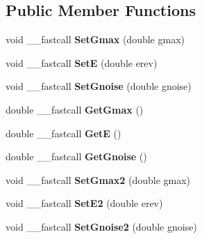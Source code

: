 \subsection*{Public Member Functions}
\begin{DoxyCompactItemize}
\item 
\hypertarget{class_t_h_h2_current_a1a74206e21791457b2d88a212c8911b3}{void \+\_\+\+\_\+fastcall {\bfseries Set\+Gmax} (double gmax)}\label{class_t_h_h2_current_a1a74206e21791457b2d88a212c8911b3}

\item 
\hypertarget{class_t_h_h2_current_a57808f5995477893b087c6381c957626}{void \+\_\+\+\_\+fastcall {\bfseries Set\+E} (double erev)}\label{class_t_h_h2_current_a57808f5995477893b087c6381c957626}

\item 
\hypertarget{class_t_h_h2_current_a6c46b837252a9615d2f9cb30949088d7}{void \+\_\+\+\_\+fastcall {\bfseries Set\+Gnoise} (double gnoise)}\label{class_t_h_h2_current_a6c46b837252a9615d2f9cb30949088d7}

\item 
\hypertarget{class_t_h_h2_current_a9bb350baab01c72a7477ec1c354778a4}{double \+\_\+\+\_\+fastcall {\bfseries Get\+Gmax} ()}\label{class_t_h_h2_current_a9bb350baab01c72a7477ec1c354778a4}

\item 
\hypertarget{class_t_h_h2_current_ab37ef56e6ceeea0b0054c79d15a5612a}{double \+\_\+\+\_\+fastcall {\bfseries Get\+E} ()}\label{class_t_h_h2_current_ab37ef56e6ceeea0b0054c79d15a5612a}

\item 
\hypertarget{class_t_h_h2_current_afe78109bb8371fa808f928c7b87dc22e}{double \+\_\+\+\_\+fastcall {\bfseries Get\+Gnoise} ()}\label{class_t_h_h2_current_afe78109bb8371fa808f928c7b87dc22e}

\item 
\hypertarget{class_t_h_h2_current_a2c20ebc20ee04773ee0526cf9562a216}{void \+\_\+\+\_\+fastcall {\bfseries Set\+Gmax2} (double gmax)}\label{class_t_h_h2_current_a2c20ebc20ee04773ee0526cf9562a216}

\item 
\hypertarget{class_t_h_h2_current_a229cb595158f43f4098560d086005ea3}{void \+\_\+\+\_\+fastcall {\bfseries Set\+E2} (double erev)}\label{class_t_h_h2_current_a229cb595158f43f4098560d086005ea3}

\item 
\hypertarget{class_t_h_h2_current_a54f17d790ee8638078a3d07f8eea7b0f}{void \+\_\+\+\_\+fastcall {\bfseries Set\+Gnoise2} (double gnoise)}\label{class_t_h_h2_current_a54f17d790ee8638078a3d07f8eea7b0f}


\end{DoxyCompactItemize}
